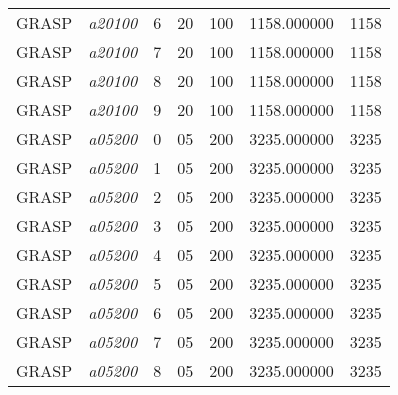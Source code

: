 {\begin{longtable}{cc|c|cc|cc}
			GRASP              & \textit{a20100}    & 6                               & 20               & 100              & 1158.000000                          & 1158 \\ 
			GRASP              & \textit{a20100}    & 7                               & 20               & 100              & 1158.000000                          & 1158 \\ 
			GRASP              & \textit{a20100}    & 8                               & 20               & 100              & 1158.000000                          & 1158 \\ 
			GRASP              & \textit{a20100}    & 9                               & 20               & 100              & 1158.000000                          & 1158 \\ \hline
			GRASP              & \textit{a05200}    & 0                               & 05               & 200              & 3235.000000                          & 3235 \\ 
			GRASP              & \textit{a05200}    & 1                               & 05               & 200              & 3235.000000                          & 3235 \\ 
			GRASP              & \textit{a05200}    & 2                               & 05               & 200              & 3235.000000                          & 3235 \\ 
			GRASP              & \textit{a05200}    & 3                               & 05               & 200              & 3235.000000                          & 3235 \\ 
			GRASP              & \textit{a05200}    & 4                               & 05               & 200              & 3235.000000                          & 3235 \\ 
			GRASP              & \textit{a05200}    & 5                               & 05               & 200              & 3235.000000                          & 3235 \\ 
			GRASP              & \textit{a05200}    & 6                               & 05               & 200              & 3235.000000                          & 3235 \\ 
			GRASP              & \textit{a05200}    & 7                               & 05               & 200              & 3235.000000                          & 3235 \\ 
			GRASP              & \textit{a05200}    & 8                               & 05               & 200              & 3235.000000                          & 3235 \\ 

\end{longtable}}
